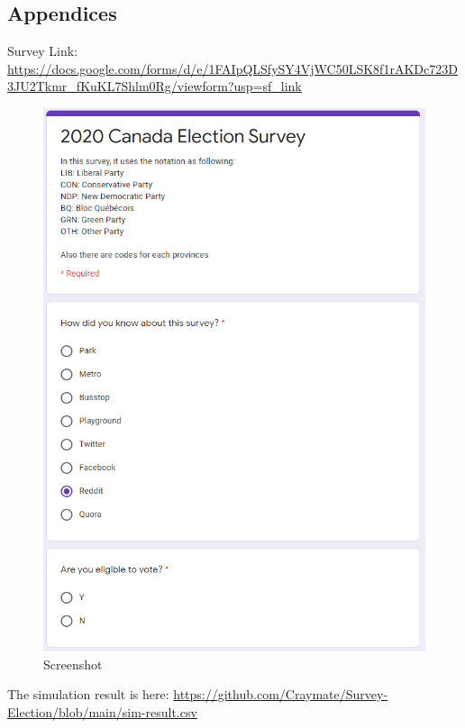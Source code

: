 \documentclass[
]{article}
\begin{document}
\hypertarget{appendices}{%
\subsection{Appendices}\label{appendices}}

Survey Link:
\url{https://docs.google.com/forms/d/e/1FAIpQLSfySY4VjWC50LSK8f1rAKDc723D3JU2Tkmr_fKuKL7Shlm0Rg/viewform?usp=sf_link}

\begin{figure}
\centering
\includegraphics{./screenshot.PNG}
\caption{Screenshot}
\end{figure}

The simulation result is here:
\url{https://github.com/Craymate/Survey-Election/blob/main/sim-result.csv}
\end{document}
